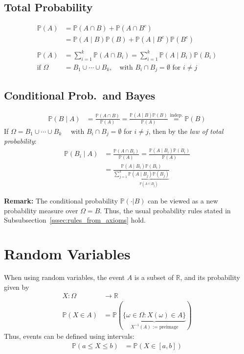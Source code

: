 \subsection{Total Probability}
\noindent\begin{align*}
    \mathbb{P}(A)     & =\mathbb{P}(A\cap B)+\mathbb{P}(A\cap B^c)                                           \\
                      & =\mathbb{P}(A\mid B)\mathbb{P}(B)+\mathbb{P}(A\mid B^c)\mathbb{P}(B^c)               \\\\
    \mathbb{P}(A)     & =\sum_{i=1}^k\mathbb{P}(A\cap B_i) =\sum_{i=1}^k\mathbb{P}(A\mid B_i)\mathbb{P}(B_i) \\
    \text{if } \Omega & =B_1\cup\cdots\cup B_k,\quad\text{with }B_i\cap B_j=\emptyset\text{ for }i\neq j
\end{align*}
\subsection{Conditional Prob.\ and Bayes}
\noindent\begin{align*}
    \mathbb{P}(B\mid A) & =\frac{\mathbb{P}(A\cap B)}{\mathbb{P}(A)}=\frac{\mathbb{P}(A\mid B)\mathbb{P}(B)}{\mathbb{P}(A)} \overset{\text{indep.}}{=} \mathbb{P}(B)
\end{align*}
If $\Omega=B_1\cup\cdots\cup B_k\quad$ with $B_i\cap B_j=\emptyset$ for $i\neq j$, then by the \textit{law of total probability}:
\noindent\begin{align*}
    \mathbb{P}(B_i\mid A) & =\frac{\mathbb{P}(A\cap B_i)}{\mathbb{P}(A)}=\frac{\mathbb{P}(A\mid B_i)\mathbb{P}(B_i)}{\mathbb{P}(A)}                              \\
                          & =\frac{\mathbb{P}(A\mid B_i)\mathbb{P}(B_i)}{\sum_{j=1}^k \underbrace{\mathbb{P}(A\mid B_j)\mathbb{P}(B_j)}_{\mathbb{P}(A\cap B_j)}}
\end{align*}

\textbf{Remark:} The conditional probability $\mathbb{P}(\cdot|B)$ can be viewed as a new probability measure over $\Omega=B$. Thus, the usual probability rules stated in Subsubsection\ \ref{sssec:rules_from_axioms} hold.

\section{Random Variables}
When using random variables, the event $A$ is a subset of $\mathbb{R}$, and its probability given by
\noindent\begin{align*}
    X : \Omega         & \rightarrow \mathbb{R}                                                                      \\
    \mathbb{P}(X\in A) & =\mathbb{P}(\underbrace{\{\omega\in\Omega:X(\omega)\in A\}}_{X^{-1}(A)\text{ := preimage}}) %
\end{align*}
Thus, events can be defined using intervals:
\noindent\begin{align*}
    \mathbb{P}(a\leq X\leq b) & =\mathbb{P}(X\in[a,b])
\end{align*}

